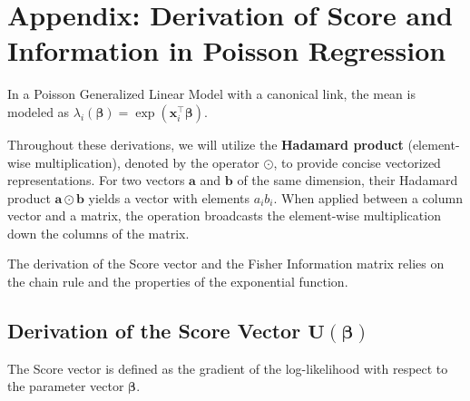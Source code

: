 \documentclass[
  letterpaper,
  DIV=11,
  numbers=noendperiod]{scrreprt}
\renewcommand{\[}{\begin{equation}}
\renewcommand{\]}{\end{equation}}
\theoremstyle{definition}
\theoremstyle{plain}
\theoremstyle{plain}
\theoremstyle{plain}
\theoremstyle{definition}
\theoremstyle{plain}
\theoremstyle{remark}
\begin{document}
\section{Appendix: Derivation of Score and Information in Poisson
Regression}\label{appendix-derivation-of-score-and-information-in-poisson-regression}

In a Poisson Generalized Linear Model with a canonical link, the mean is
modeled as
\(\lambda_i(\boldsymbol{\beta}) = \exp(\mathbf{x}_i^\top \boldsymbol{\beta})\).

Throughout these derivations, we will utilize the \textbf{Hadamard
product} (element-wise multiplication), denoted by the operator
\(\odot\), to provide concise vectorized representations. For two
vectors \(\mathbf{a}\) and \(\mathbf{b}\) of the same dimension, their
Hadamard product \(\mathbf{a} \odot \mathbf{b}\) yields a vector with
elements \(a_i b_i\). When applied between a column vector and a matrix,
the operation broadcasts the element-wise multiplication down the
columns of the matrix.

The derivation of the Score vector and the Fisher Information matrix
relies on the chain rule and the properties of the exponential function.

\subsection{\texorpdfstring{Derivation of the Score Vector
\(\mathbf{U}(\boldsymbol{\beta})\)}{Derivation of the Score Vector \textbackslash mathbf\{U\}(\textbackslash boldsymbol\{\textbackslash beta\})}}\label{derivation-of-the-score-vector-mathbfuboldsymbolbeta}

The Score vector is defined as the gradient of the log-likelihood with
respect to the parameter vector \(\boldsymbol{\beta}\).
\end{document}
